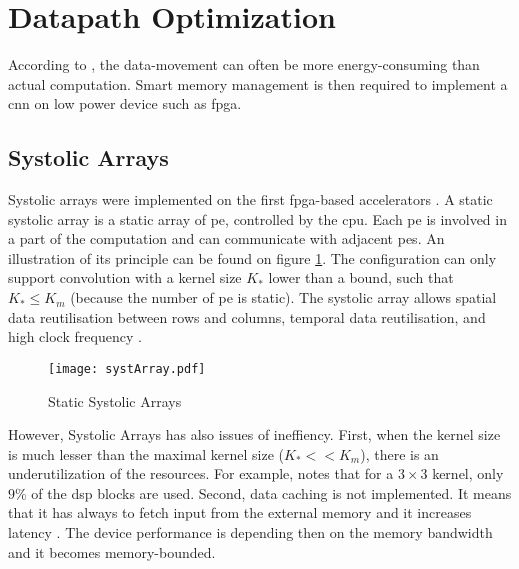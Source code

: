 \section{Datapath Optimization} \label{sec:dtptopti}
According to \textcite{chen_eyeriss_2017}, the data-movement can often be more energy-consuming than actual computation. Smart memory management is then required to implement a \acrshort{cnn} on low power device such as \acrshort{fpga}.
%
%
\subsection{Systolic Arrays}
%
%
Systolic arrays were implemented on the first \acrshort{fpga}-based accelerators \cite{farabet_cnp_2009, gokhale_240_2014}. A static systolic array is a static array of \acrshort{pe}, controlled by the \acrshort{cpu}. Each \acrshort{pe} is involved in a part of the computation and can communicate with adjacent \acrshort{pe}s. An illustration of its principle can be found on figure \ref{fig:sytar}. The configuration can only support convolution with a kernel size $K_*$ lower than a bound, such that $K_* \leq K_m$ (because the number of \acrshort{pe} is static). The systolic array allows spatial data reutilisation between rows and columns, temporal data reutilisation, and high clock frequency \cite{joos_de_ter_beerst_accelerating_2019, mittal_survey_2020}.
\begin{figure}
    \centering
    \texttt{[image: systArray.pdf]}
    \caption{Static Systolic Arrays}
    \label{fig:sytar}
\end{figure} \newline \newline
However, Systolic Arrays has also issues of ineffiency. First, when the kernel size is much lesser than the maximal kernel size ($K_* << K_m$), there is an underutilization of the resources. For example, \cite{gokhale_240_2014} notes that for a $3 \times 3$ kernel, only $9\%$ of the \acrfull{dsp} blocks are used. Second, data caching is not implemented. It means that it has always to fetch input from the external memory and it increases latency \cite{wei_automated_2017, abdelouahab_accelerating_2018}. The device performance is depending then on the memory bandwidth and it becomes memory-bounded.
%
%
